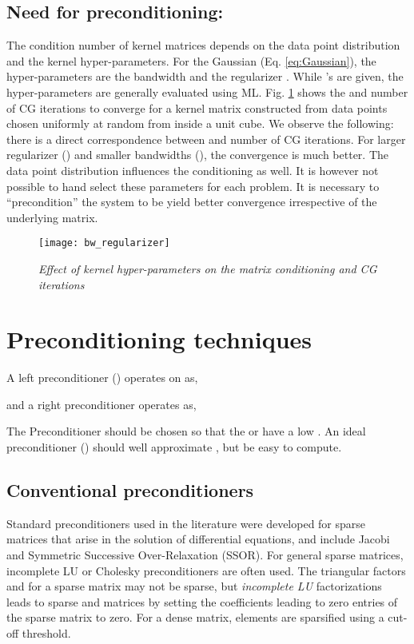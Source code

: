 \documentclass[10pt,journal,letterpaper,compsoc]{IEEEtran}
\begin{document}
\subsection{Need for preconditioning: }The condition number  of kernel matrices depends on the data point distribution and the kernel hyper-parameters. For the Gaussian (Eq. \ref{eq:Gaussian}), the hyper-parameters are the bandwidth  and the regularizer . While 's are given, the hyper-parameters are generally evaluated using ML. Fig. \ref{fig:GaussianHyperparameters} shows the  and number of CG iterations to converge for a kernel matrix constructed from data points chosen uniformly at random from inside a unit cube. We observe the following: there is a direct correspondence between  and number of CG iterations. For larger regularizer () and smaller bandwidths (), the convergence is much better. The data point distribution influences the conditioning as well. It is however not possible to hand select these parameters for each problem. It is necessary to ``precondition'' \cite{SaadIterativeMethods} the system to be yield better convergence irrespective of the underlying matrix.

\begin{figure}[bth]
\centering
\texttt{[image: bw\_regularizer]}
\caption{\emph{Effect of kernel hyper-parameters on the matrix conditioning and CG iterations}\label{fig:GaussianHyperparameters}}
\end{figure}

\section{Preconditioning techniques\label{sec:precond}}
A left preconditioner () operates on  as,

and a right preconditioner operates as,

The Preconditioner  should be chosen so that the  or  have a low . An ideal preconditioner () should well approximate , but be easy to compute.

\subsection{Conventional preconditioners}
Standard preconditioners used in the literature were developed for sparse matrices that arise in the solution of differential equations, and include Jacobi and Symmetric Successive Over-Relaxation (SSOR). For general sparse matrices, incomplete LU or Cholesky preconditioners are often used. The triangular factors  and   for a sparse matrix may not be sparse, but {\em incomplete LU} factorizations leads to sparse  and  matrices by setting the coefficients leading to zero entries of the sparse matrix to zero. For a dense matrix, elements are sparsified using a cut-off threshold.
\end{document}
